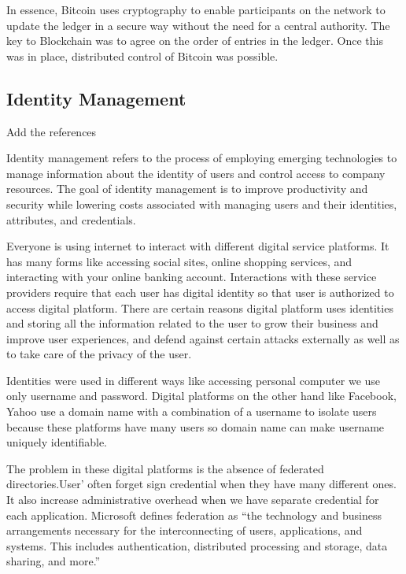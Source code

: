 In essence, Bitcoin uses cryptography to enable participants on the network to update the ledger in a secure way without the need for a central authority. The key to Blockchain was to agree on the order of entries in the ledger. Once this was in place, distributed control of Bitcoin was possible.

\subsection{Identity Management}
\begin{notation}
  Add the references
\end{notation}

Identity management refers to the process of employing emerging technologies to manage information about the identity of users and control access to company resources\citep{IdentityManagement}. The goal of identity management is to improve productivity and security while lowering costs associated with managing users and their identities, attributes, and credentials.

Everyone is using internet to interact with different digital service platforms.
It has many forms like accessing social sites, online shopping services, and interacting with your online banking account. Interactions with these service providers require that each user has digital identity so that user is authorized to access digital platform. There are certain reasons digital platform uses identities and storing all the information related to the user to grow their business and improve user experiences, and defend against certain attacks externally as well as to take care of the privacy of the user.

Identities were used in different ways like accessing personal computer we use only username and password. Digital platforms on the other hand like Facebook, Yahoo use a domain name with a combination of a username to isolate users because these platforms have many users so domain name can make username uniquely identifiable\citep{gondor2016distributed}. 

The problem in these digital platforms is the absence of federated directories.User' often forget sign credential when they have many different ones. It also increase administrative overhead when we have separate credential for each application. Microsoft defines federation as “the technology and business arrangements necessary for the interconnecting of users, applications, and systems. This includes
authentication, distributed processing and storage, data sharing, and more\citep{IdentityManagement}.”

